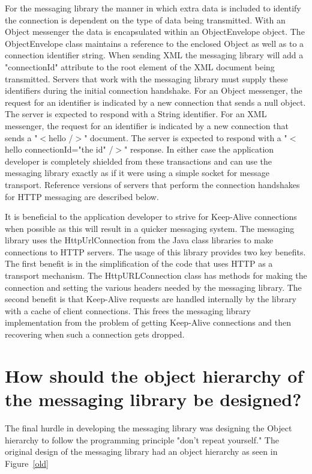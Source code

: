 \documentclass{article}
\begin{document}
For the messaging library the manner in which extra data is included
to identify the connection is dependent on the type of data being
transmitted.  With an Object messenger the data is encapsulated within
an ObjectEnvelope object.  The ObjectEnvelope class maintains a
reference to the enclosed Object as well as to a connection identifier
string.  When sending XML the messaging library will add a
"connectionId" attribute to the root element of the XML document being
transmitted.  Servers that work with the messaging library must supply
these identifiers during the initial connection handshake.  For an
Object messenger, the request for an identifier is indicated by a new
connection that sends a null object.  The server is expected to
respond with a String identifier.  For an XML messenger, the request
for an identifier is indicated by a new connection that sends a
"$<$hello /$>$" document.  The server is expected to respond with a
"$<$hello connectionId="the id" /$>$" response.  In either case the
application developer is completely shielded from these transactions
and can use the messaging library exactly as if it were using a simple
socket for message transport.  Reference versions of servers that
perform the connection handshakes for HTTP messaging are described
below.

It is beneficial to the application developer to strive for Keep-Alive
connections when possible as this will result in a quicker messaging
system.  The messaging library uses the HttpUrlConnection from the Java
class libraries to make connections to HTTP servers.  The usage of
this library provides two key benefits.  The first benefit is in the
simplification of the code that uses HTTP as a transport mechanism.
The HttpURLConnection class has methods for making the connection and
setting the various headers needed by the messaging library.  The
second benefit is that Keep-Alive requests are handled internally by
the library with a cache of client connections.  This frees the
messaging library implementation from the problem of getting
Keep-Alive connections and then recovering when such a connection gets
dropped.

\section{How should the object hierarchy of the messaging library be designed?}

The final hurdle in developing the messaging library was designing the
Object hierarchy to follow the programming principle "don't repeat
yourself."  The original design of the messaging library had an object
hierarchy as seen in Figure~\ref{old}
\end{document}
